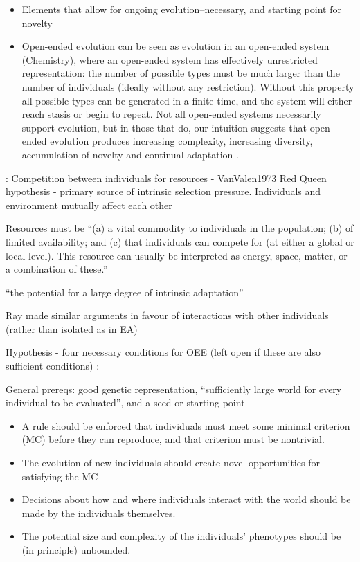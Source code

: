 \begin{itemize}
	\item
	Elements that allow for ongoing evolution--necessary, and starting
	point for novelty
	\item
	Open-ended evolution can be seen as evolution in an open-ended system
	(\eg Chemistry), where an open-ended system has effectively
	unrestricted representation: the number of possible types must be much
	larger than the number of individuals (ideally without any
	restriction). Without this property all possible types can be
	generated in a finite time, and the system will either reach stasis or
	begin to repeat. Not all open-ended systems necessarily support
	evolution, but in those that do, our intuition suggests that
	open-ended evolution produces increasing complexity, increasing
	diversity, accumulation of novelty and continual adaptation
	\autocite{Lehman2012}.
\end{itemize}

\autocite{Taylor2001}:
Competition between individuals for resources - VanValen1973 Red Queen
hypothesis - primary source of intrinsic selection pressure.
Individuals and environment mutually affect each other

Resources must be ``(a) a vital commodity to individuals in the
population; (b) of limited availability; and (c) that individuals
can compete for (at either a global or local level). This resource
can usually be interpreted as energy, space, matter, or a
combination of these.''

``the potential for a large degree of intrinsic adaptation''

Ray made similar arguments in favour of interactions with other individuals (rather than isolated as in EA) 		


Hypothesis - four necessary conditions for OEE (left open if these are also sufficient conditions) \autocite{Soros2014}:

General prereqs: good genetic representation, ``sufficiently large world for every individual to be evaluated'', and a seed or starting point

\begin{itemize}
	\item
	
	A rule should be enforced that individuals must meet some minimal
	criterion (MC) before they can reproduce, and that criterion must be
	nontrivial.
	
	\item
	
	The evolution of new individuals should create novel opportunities
	for satisfying the MC
	
	\item
	
	Decisions about how and where individuals interact with the world
	should be made by the individuals themselves.
	
	\item
	
	The potential size and complexity of the individuals' phenotypes
	should be (in principle) unbounded.
	
\end{itemize}

